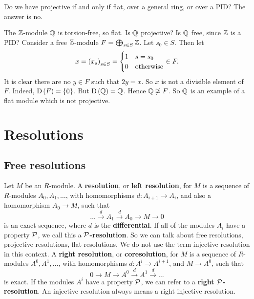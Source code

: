 \begin{example*}
Do we have projective if and only if flat, over a general ring, or over a PID? The answer is no.
\end{example*}

The $ \mathbb{Z} $-module $ \mathbb{Q} $ is torsion-free, so flat. Is $ \mathbb{Q} $ projective? Is $ \mathbb{Q} $ free, since $ \mathbb{Z} $ is a PID? Consider a free $ \mathbb{Z} $-module $ F = \bigoplus_{s \in S} \mathbb{Z} $. Let $ s_0 \in S $. Then let
$$ x = \br{x_s}_{s \in S} =
\begin{cases}
1 & s = s_0 \\
0 & \text{otherwise}
\end{cases}
\in F. $$
It is clear there are no $ y \in F $ such that $ 2y = x $. So $ x $ is not a divisible element of $ F $. Indeed, $ \D\br{F} = \cbr{0} $. But $ \D\br{\QQ} = \QQ $. Hence $ \mathbb{Q} \not\cong F $. So $ \mathbb{Q} $ is an example of a flat module which is not projective.

\pagebreak

\section{Resolutions}

\subsection{Free resolutions}

\begin{definition}
Let $ M $ be an $ R $-module. A \textbf{resolution}, or \textbf{left resolution}, for $ M $ is a sequence of $ R $-modules $ A_0, A_1, \dots $, with homomorphisms $ d : A_{i + 1} \to A_i $, and also a homomorphism $ A_0 \to M $, such that
$$ \dots \xrightarrow{d} A_1 \xrightarrow{d} A_0 \to M \to 0 $$
is an exact sequence, where $ d $ is the \textbf{differential}. If all of the modules $ A_i $ have a property $ \mathcal{P} $, we call this a \textbf{$ \mathcal{P} $-resolution}. So we can talk about free resolutions, projective resolutions, flat resolutions. We do not use the term injective resolution in this context. A \textbf{right resolution}, or \textbf{coresolution}, for $ M $ is a sequence of $ R $-modules $ A^0, A^1, \dots $, with homomorphisms $ d : A^i \to A^{i + 1} $, and $ M \to A^0 $, such that
$$ 0 \to M \to A^0 \xrightarrow{d} A^1 \xrightarrow{d} \dots $$
is exact. If the modules $ A^i $ have a property $ \mathcal{P} $, we can refer to a \textbf{right $ \mathcal{P} $-resolution}. An injective resolution always means a right injective resolution.
\end{definition}

